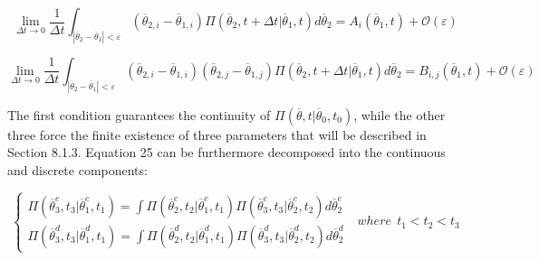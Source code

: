 \begin{equation}
\label{eq:chapKolmogAssump3}
\lim_{\Delta t \to 0} \frac{1}{\Delta t}  \int_{|
\overline{\theta}_{2}-\overline{\theta}_{1}|<\varepsilon }   
\left ( \overline{\theta}_{2,i} - \overline{\theta}_{1,i} \right )
\Pi \left (\overline{\theta}_{2},t+\Delta t|\overline{\theta}_{1},t  \right ) 
d\overline{\theta}_{2} = A_{i}\left ( \overline{\theta}_{1},t \right ) + 
\mathcal{O}\left ( \varepsilon \right )
\end{equation}

\begin{equation}
\label{eq:chapKolmogAssump4}
\lim_{\Delta t \to 0} \frac{1}{\Delta t}  \int_{|
\overline{\theta}_{2}-\overline{\theta}_{1}|<\varepsilon }   
\left ( \overline{\theta}_{2,i} - \overline{\theta}_{1,i} \right ) \left ( 
\overline{\theta}_{2,j} - \overline{\theta}_{1,j} \right )
\Pi \left (\overline{\theta}_{2},t+\Delta t|\overline{\theta}_{1},t  \right ) 
d\overline{\theta}_{2} = B_{i,j}\left ( \overline{\theta}_{1},t \right ) + 
\mathcal{O}\left ( \varepsilon \right )
\end{equation}

The first condition guarantees the continuity of $\Pi \left (\overline{\theta},t|\overline{\theta}_{0},t_{0}  \right )$, while the other three force the finite existence of three parameters that will be described in Section 8.1.3. 
Equation 25 can be furthermore decomposed into the continuous and discrete components:

\begin{equation}
\label{eq:chapKolmogIntegralFormContDisct}
\left\{\begin{matrix}
\Pi \left (\overline{\theta}_{3}^{c},t_{3}|\overline{\theta}_{1}^{c},t_{1}  \right ) 
= \int \Pi \left (\overline{\theta}_{2}^{c},t_{2}|\overline{\theta}_{1}^{c},t_{1}  
\right ) \Pi \left (\overline{\theta}_{3}^{c},t_{3}|\overline{\theta}_{2}^{c},t_{2}  
\right ) d\overline{\theta}_{2}^{c}
\\ 
\Pi \left (\overline{\theta}_{3}^{d},t_{3}|\overline{\theta}_{1}^{d},t_{1}  \right ) 
= \int \Pi \left (\overline{\theta}_{2}^{d},t_{2}|\overline{\theta}_{1}^{d},t_{1}  
\right ) \Pi \left (\overline{\theta}_{3}^{d},t_{3}|\overline{\theta}_{2}^{d},t_{2}  
\right ) d\overline{\theta}_{2}^{d}
\end{matrix}\right.
\: \: \: where \:\:   t_{1}<t_{2}<t_{3}
\end{equation}

